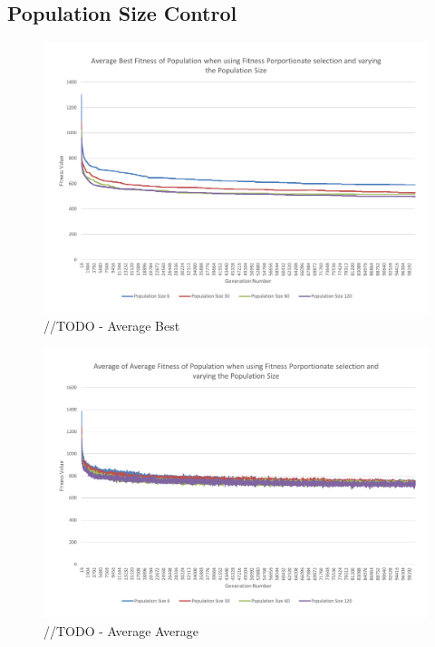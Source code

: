 \subsection{Population Size Control} %
\label{sub:population_size_control}
\begin{figure}
	\centerline{\includegraphics[width=\paperwidth]{figures/CircleTests/CirclePopulationSizeControllAverageBest.pdf}}
	\caption{//TODO - Average Best}
\end{figure}

\begin{figure}
	\centerline{\includegraphics[width=\paperwidth]{figures/CircleTests/CirclePopulationSizeControllAverageAverage.pdf}}
	\caption{//TODO - Average Average}
\end{figure}

